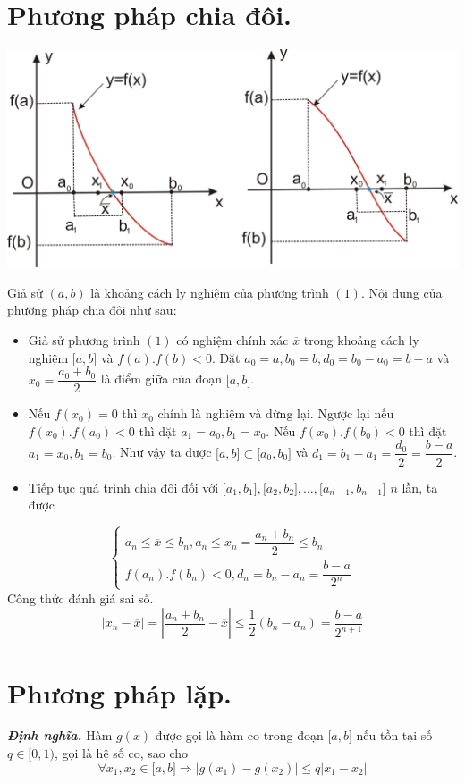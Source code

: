 \documentclass[12pt, a4paper]{report}
\def\DN{\textbf{\textit{Định nghĩa. }}}
\begin{document}
\section{Phương pháp chia đôi.}
\begin{center}
    \includegraphics[scale = 0.38]{2.png}
\end{center}
Giả sử $(a,b)$ là khoảng cách ly nghiệm của phương trình $(1)$. Nội dung của phương pháp chia đôi như sau:
\begin{itemize}
    \item Giả sử phương trình $(1)$ có nghiệm chính xác $\overline{x}$ trong khoảng cách ly nghiệm $\lbrack a,b \rbrack$ và $f(a).f(b)<0$. Đặt $a_0 = a, b_0 = b, d_0 = b_0 - a_0 = b - a$ và $x_0 = \dfrac{a_0 + b_0}{2}$ là điểm giữa của đoạn $\lbrack a,b \rbrack$.
    \item Nếu $f(x_0)=0$ thì $x_0$ chính là nghiệm và dừng lại. Ngược lại nếu $f(x_0).f(a_0)<0$ thì dặt $a_1 = a_0,b_1 = x_0$. Nếu $f(x_0).f(b_0)<0$ thì đặt $a_1 = x_0, b_1 = b_0$. Như vậy ta được $\lbrack a,b \rbrack \subset \lbrack a_0,b_0 \rbrack$ và $d_1 = b_1 - a_1 = \dfrac{d_0}{2} = \dfrac{b-a}{2}$.
    \item Tiếp tục quá trình chia đôi đối với $\lbrack a_1,b_1 \rbrack, \lbrack a_2,b_2 \rbrack,\ldots,\lbrack a_{n-1},b_{n-1} \rbrack$ $n$ lần, ta được
\end{itemize}
\[
    \begin{cases}
        a_n \leq \overline{x} \leq b_n, a_n \leq x_n = \dfrac{a_n+b_n}{2}\leq b_n\\
        f(a_n).f(b_n)<0, d_n = b_n - a_n = \dfrac{b-a}{2^n}
    \end{cases}    
\]
Công thức đánh giá sai số.
\[
    |x_n - \overline{x}| = \left\lvert \frac{a_n + b_n}{2}-\overline{x} \right\lvert \leq \frac{1}{2}(b_n - a_n) = \frac{b-a}{2^{n+1}}   
\]
\section{Phương pháp lặp.}
\DN Hàm $g(x)$ được gọi là hàm co trong đoạn $\lbrack a,b \rbrack$ nếu tồn tại số $q \in \lbrack 0,1)$, gọi là hệ số co, sao cho
\[
    \forall x_1,x_2 \in \lbrack a,b \rbrack \Rightarrow |g(x_1) - g(x_2)| \leq q|x_1 - x_2|
\]
\end{document}
